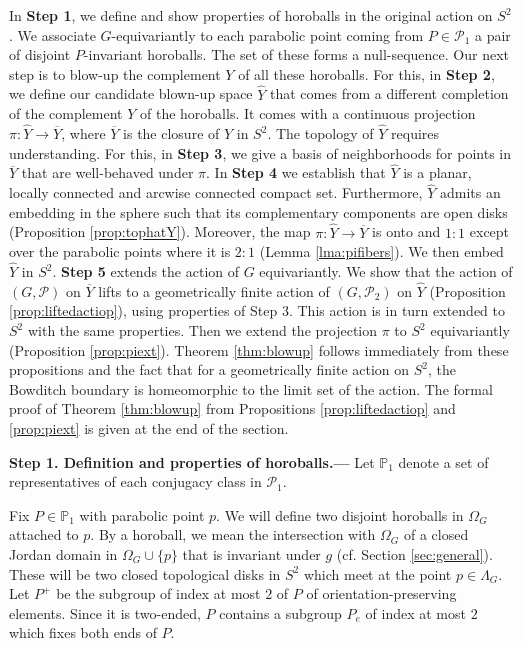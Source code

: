 \documentclass[11pt]{article}
\theoremstyle{definition}
\newcommand\PP{\mathcal{P}}
\renewcommand\hat{\widehat}
\begin{document}
 In {\bf Step 1}, we define and show properties of horoballs in the original action on $S^2$. We associate $G$-equivariantly to each parabolic point coming from $P\in \PP_1$ a pair of 
disjoint $P$-invariant horoballs. The set of these forms a null-sequence. Our next step is to blow-up the complement $Y$
of all these horoballs. For this, in {\bf Step 2}, we define our candidate blown-up space $\hat{Y}$ that comes from
a different completion of the complement $Y$ of the horoballs.  It comes with a continuous projection
$\pi:\hat{Y}\to \overline{Y}$, where $\overline{Y}$ is the closure of $Y$ in $S^2$. The topology of $\hat{Y}$ requires understanding. For this, in {\bf Step 3}, we give a basis of  
neighborhoods for points in $\overline{Y}$ that are well-behaved under $\pi$. In {\bf Step 4} we establish that
$\widehat{Y}$ is a planar, locally connected and arcwise connected compact
set. Furthermore, $\hat{Y}$ admits an embedding in the sphere such that its complementary components are open disks (Proposition \ref{prop:tophatY}). Moreover, the map $\pi:\widehat{Y} \to \overline{Y}$ is onto and $1:1$ except over the parabolic points where it is $2:1$ (Lemma \ref{lma:pifibers}).  We then embed $\hat{Y}$ in $S^2$. {\bf Step 5} extends the action of $G$ equivariantly. 
We show that the action of $(G,\PP)$ on $\overline{Y}$ lifts to a geometrically finite action of $(G,\PP_2)$ on $\hat{Y}$ (Proposition \ref{prop:liftedactiop}), using properties of  
Step 3.
This action is in turn extended to $S^2$ with the same properties. Then we extend the projection $\pi$ to $S^2$ equivariantly (Proposition \ref{prop:piext}). Theorem  \ref{thm:blowup} follows immediately from these propositions and the fact that for a geometrically finite action on $S^2$, the Bowditch boundary is 
homeomorphic to the limit set of the action. The formal proof of Theorem \ref{thm:blowup} from Propositions \ref{prop:liftedactiop} and \ref{prop:piext} is given at the end of the section. 

\medskip


{\noindent\bf Step 1. Definition and properties of horoballs.---} 
Let $\mathbb{P}_1$ denote a set of representatives of each conjugacy class in $\PP_1$. 

\medskip 


Fix $P\in\mathbb{P}_1$  with parabolic point $p$.  We will  
define two disjoint horoballs in $\Omega_G$ attached to $p$. By a horoball, we mean the intersection with $\Omega_G$ of a closed Jordan domain in $\Omega_G\cup\{p\}$ that is invariant under  $g$ (cf. Section \ref{sec:general}). 
These will be two closed topological disks in $S^2$ which meet at the point $p \in \Lambda_G$.  
Let $P^+$ be the subgroup of index at most $2$ of $P$ of orientation-preserving elements.
Since it is two-ended, $P$ contains a subgroup $P_e$ of index at most $2$ which fixes both ends of $P$. 
\end{document}
